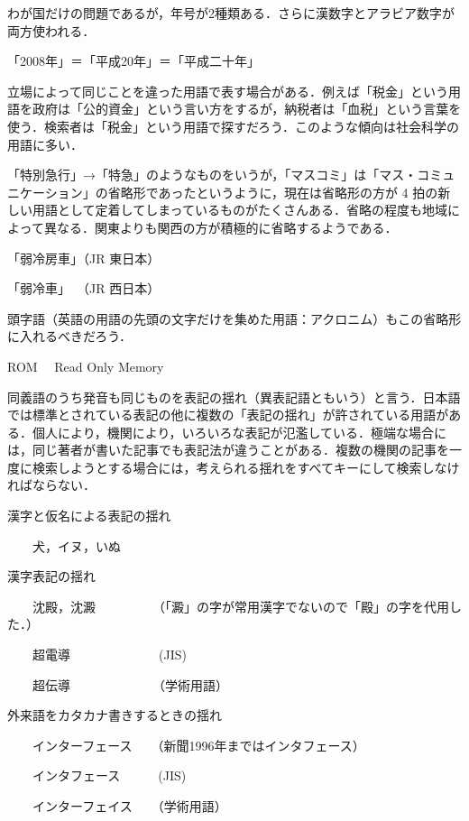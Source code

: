 \documentclass[japanese]{jnlp_1.4}
\begin{document}

わが国だけの問題であるが，年号が2種類ある．さらに漢数字とアラビア数字が両方使われる．

「2008年」＝「平成20年」＝「平成二十年」


立場によって同じことを違った用語で表す場合がある．例えば「税金」という用語を政府は「公的資金」という言い方をするが，納税者は「血税」という言葉を使う．検索者は「税金」という用語で探すだろう．このような傾向は社会科学の用語に多い．


「特別急行」→「特急」のようなものをいうが，「マスコミ」は「マス・コミュニケーション」の省略形であったというように，現在は省略形の方が 4 拍の新しい用語として定着してしまっているものがたくさんある．省略の程度も地域によって異なる．関東よりも関西の方が積極的に省略するようである．

「弱冷房車」（JR 東日本）

「弱冷車」~（JR 西日本）

頭字語（英語の用語の先頭の文字だけを集めた用語：アクロニム）もこの省略形に入れるべきだろう．

ROM　 Read Only Memory


同義語のうち発音も同じものを表記の揺れ（異表記語ともいう）と言う．日本語では標準とされている表記の他に複数の「表記の揺れ」が許されている用語がある．個人により，機関により，いろいろな表記が氾濫している．極端な場合には，同じ著者が書いた記事でも表記法が違うことがある．複数の機関の記事を一度に検索しようとする場合には，考えられる揺れをすべてキーにして検索しなければならない．

漢字と仮名による表記の揺れ

　　犬，イヌ，いぬ

漢字表記の揺れ

　　沈殿，沈澱　　　　　（「澱」の字が常用漢字でないので「殿」の字を代用した．）

　　超電導　　　　　　　(JIS)

　　超伝導　　　　　　　（学術用語）

外来語をカタカナ書きするときの揺れ

　　インターフェース　　（新聞1996年まではインタフェース）

　　インタフェース　　　(JIS)

　　インターフェイス　　（学術用語）
\end{document}
